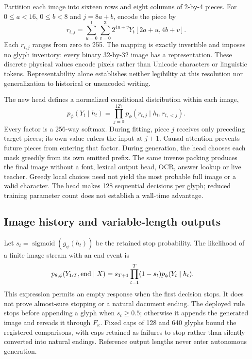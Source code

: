 \documentclass[12pt,a4paper]{article}
\providecommand{\DIFadd}[1]{{\protect\color{blue} \sf #1}} %
\begin{document}
\DIFadd{Partition each image into sixteen rows and eight columns of 2-by-4 pieces.
For $0\leq a<16$, $0\leq b<8$ and $j=8a+b$, encode the piece by
}\begin{equation}
 r_{t,j}=\sum_{u=0}^{1}\sum_{v=0}^{3}
       2^{4u+v}Y_t[2a+u,4b+v].
 \label{eq:joint-glyph-packing}
\end{equation}
\DIFadd{Each $r_{t,j}$ ranges from zero to 255. The mapping is exactly invertible and
imposes no glyph inventory: every binary 32-by-32 image has a representation.
These discrete physical values encode pixels rather than Unicode characters
or linguistic tokens. Representability alone establishes neither legibility
at this resolution nor generalization to historical or unencoded writing.
}

\DIFadd{The new head defines a normalized conditional distribution within each image,
}\begin{equation}
 p_\phi(Y_t\mid h_t)=\prod_{j=0}^{127}
 p_\phi(r_{t,j}\mid h_t,r_{t,<j}).
 \label{eq:joint-glyph-density}
\end{equation}
\DIFadd{Every factor is a 256-way softmax. During fitting, piece $j$ receives only
preceding target pieces; its own value enters the input at $j+1$. Causal
attention prevents future pieces from entering that factor. During generation,
the head chooses each mask greedily from its own emitted prefix. The same
inverse packing produces the final image without a font, lexical output head,
OCR, answer lookup or live teacher. Greedy local choices need not yield the
most probable full image or a valid character. The head makes 128 sequential
decisions per glyph; reduced training parameter count does not establish a
wall-time advantage.
}

\subsection*{\DIFadd{Image history and variable-length outputs}}
\DIFadd{Let $s_t=\operatorname{sigmoid}(g_\psi(h_t))$ be the retained stop
probability. The likelihood of a finite image stream with an end event is
}\begin{equation}
 \begin{aligned}
 p_{\theta,\phi}(Y_{1:T},{\rm end}\mid X)
  &=s_{T+1}\prod_{t=1}^{T}
       (1-s_t)p_\phi(Y_t\mid h_t).
 \end{aligned}
 \label{eq:joint-glyph-stream}
\end{equation}
\DIFadd{This expression permits an empty response when the first decision stops. It
does not prove almost-sure stopping or a natural document ending. The deployed
rule stops before appending a glyph when $s_t\geq0.5$; otherwise it appends the
generated image and rereads it through $F_\kappa$. Fixed caps of 128 and 640
glyphs bound the registered comparisons, with caps retained as failures to
stop rather than silently converted into natural endings. Reference output
lengths never enter autonomous generation.
}
\end{document}
